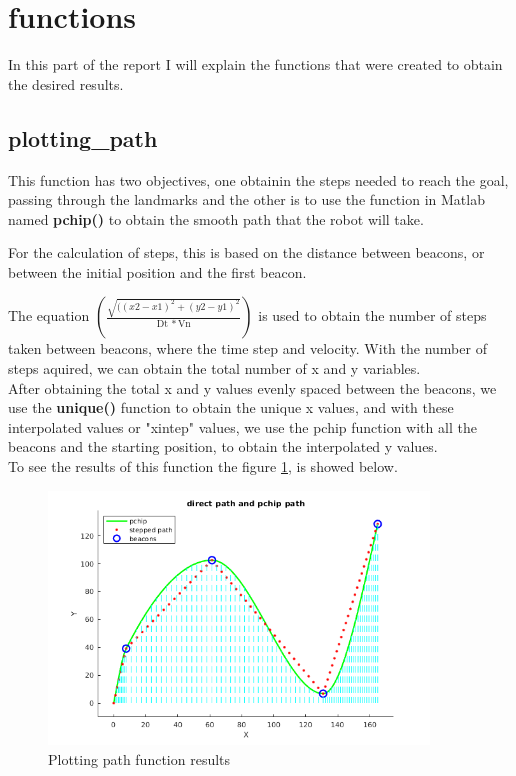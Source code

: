 \documentclass[runningheads]{llncs}
\begin{document}
\section{functions}
In this part of the report I will explain the functions that were created to obtain the desired results.

\subsection*{plotting\_path}
This function has two objectives, one obtainin the steps needed to reach the goal, passing through the landmarks 
and the other is to use the function in Matlab named \textbf{pchip()} to obtain the smooth path that the robot will take.

For the calculation of steps, this is based on the distance between beacons, or between the initial position and the first beacon.

The equation \begin{math}
\left(\frac{\sqrt{((x2-x1)^2+(y2-y1)^2}}{\mathrm{Dt}\, * \mathrm{Vn}}\right)
\end{math} is used to obtain the number of steps taken between beacons, where the time step and velocity.
With the number of steps aquired, we can obtain the total number of  x and y variables.
\\ 
After obtaining the total x and y values evenly spaced between the beacons, we use the \textbf{unique()} function to obtain the unique x values, 
and with these interpolated values or "xintep" values, we use the pchip function with all the beacons and the starting position, to obtain the interpolated y values. 
\\

To see the results of this function the figure \ref*{plotting_path_fig}, is showed below. 

\begin{figure}[h]
\centering
\includegraphics[width=0.9\textwidth]{plotting_path.png}
\caption{Plotting path function results}
\label{plotting_path_fig}
\end{figure}
\end{document}
